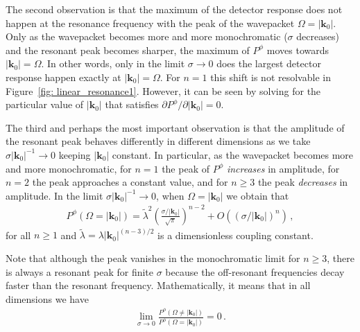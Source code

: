 \documentclass[prd,twocolumn,superscriptaddress,nofootinbib,floatfix,amsmath,amssymb]{revtex4-2}
\newcommand{\bk}{{\bm{k}}}
\newcommand{\rr}[1]{\left(#1\right)}
\begin{document}
    
    
    The second observation is that the maximum of the detector response does not happen at the resonance frequency with the peak of the wavepacket $\Omega=|\bm k_0|$. Only as the wavepacket becomes more and more monochromatic ($\sigma$ decreases) and the resonant peak becomes sharper, the maximum of $P^\phi$ moves towards $|\bk_0|=\Omega$. In other words, only in the limit $\sigma\to 0$  does the largest detector response happen exactly at $|\bk_0|=\Omega$. For $n=1$ this shift is not resolvable in  Figure~\ref{fig: linear_resonance1}. However, it can be seen by solving for the particular value of $|\bk_0|$ that satisfies $\partial P^\phi/\partial |\bk_0| = 0$. 
    	
    The third and perhaps the most important observation is that the amplitude of the resonant peak behaves differently in different dimensions as we take $\sigma|\bk_0|^{-1}\to 0$ keeping $|\bm k_0|$ constant. In particular, as the wavepacket becomes more and more monochromatic, for $n=1$ the peak of $P^\phi$ \textit{increases} in amplitude, for $n=2$ the peak approaches a constant value, and for $n\geq 3$ the peak \textit{decreases} in amplitude.  In the limit $\sigma|\bk_0|^{-1}\to 0$, when $\Omega=|\bk_0|$ we obtain that
    \begin{align}
        P^\phi(\Omega=|\bk_0|) = \tilde\lambda^2 \rr{\frac{\sigma/|\bk_0|}{\sqrt{\pi}}}^{n-2}+O((\sigma/|\bk_0|)^{n})\,,
    \end{align}
    for all $n\geq 1$ and $\tilde\lambda= \lambda|\bk_0|^{(n-3)/2}$ is a dimensionless coupling constant. %
   
    
    Note that although the peak vanishes in the monochromatic limit for $n\geq 3$, there is always a resonant peak for finite $\sigma$ because the off-resonant frequencies decay faster than the resonant frequency. Mathematically, it means that in all dimensions we have
    \begin{align}
        \lim_{\sigma\to 0}
        \frac{P^\phi(\Omega\neq |\bk_0|)}{P^\phi(\Omega=|\bk_0|)} = 0\,.
    \end{align}
    	
\end{document}
